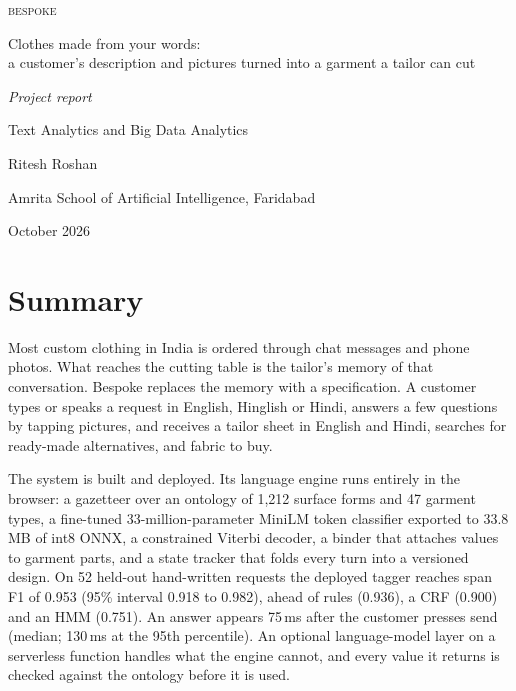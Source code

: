 \documentclass[11pt,oneside,openany]{book}
\begin{document}
\frontmatter
\pagestyle{empty}

\begin{titlepage}
\centering
\vspace*{38mm}
{\fontsize{40}{44}\selectfont\scshape bespoke\par}
\vspace{12mm}
{\Large Clothes made from your words:\\[3pt] a customer's description and pictures turned into a garment a tailor can cut\par}
\vspace{16mm}
{\large\itshape Project report\par}
\vspace{4mm}
{\normalsize\color{soft} Text Analytics and Big Data Analytics\par}
\vfill
{\large Ritesh Roshan\par}
\vspace{12mm}
{\normalsize Amrita School of Artificial Intelligence, Faridabad\par}
\vspace{3mm}
{\normalsize\color{soft} October 2026\par}
\vspace*{14mm}
\end{titlepage}

\chapter*{Summary}
\pagestyle{body}
Most custom clothing in India is ordered through chat messages and phone photos. What reaches the cutting table is the tailor's memory of that conversation. Bespoke replaces the memory with a specification. A customer types or speaks a request in English, Hinglish or Hindi, answers a few questions by tapping pictures, and receives a tailor sheet in English and Hindi, searches for ready-made alternatives, and fabric to buy.

The system is built and deployed. Its language engine runs entirely in the browser: a gazetteer over an ontology of 1,212 surface forms and 47 garment types, a fine-tuned 33-million-parameter MiniLM token classifier exported to 33.8\,MB of int8 ONNX, a constrained Viterbi decoder, a binder that attaches values to garment parts, and a state tracker that folds every turn into a versioned design. On 52 held-out hand-written requests the deployed tagger reaches span F1 of 0.953 (95\% interval 0.918 to 0.982), ahead of rules (0.936), a CRF (0.900) and an HMM (0.751). An answer appears 75\,ms after the customer presses send (median; 130\,ms at the 95th percentile). An optional language-model layer on a serverless function handles what the engine cannot, and every value it returns is checked against the ontology before it is used.
\end{document}
